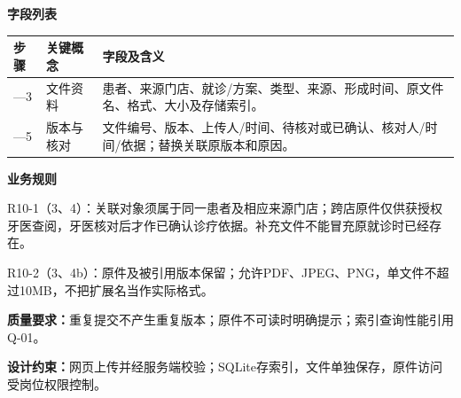 \documentclass[UTF8,a4paper,zihao=-4,fontset=none]{ctexart}
\begin{document}
\noindent\textbf{字段列表}\par
{\setlength{\tabcolsep}{3pt}\renewcommand{\arraystretch}{1.04}
\noindent\begin{tabular}{@{}>{\raggedright\arraybackslash}p{1.2cm}>{\raggedright\arraybackslash}p{2.2cm}>{\raggedright\arraybackslash}p{12.3cm}@{}}
\toprule
步骤 & 关键概念 & 字段及含义 \\ \midrule
1—3 & 文件资料 & 患者、来源门店、就诊/方案、类型、来源、形成时间、原文件名、格式、大小及存储索引。 \\
3—5 & 版本与核对 & 文件编号、版本、上传人/时间、待核对或已确认、核对人/时间/依据；替换关联原版本和原因。 \\
\bottomrule
\end{tabular}\par}
\smallskip
\noindent\textbf{业务规则}\par
\noindent R10-1（3、4）：关联对象须属于同一患者及相应来源门店；跨店原件仅供获授权牙医查阅，牙医核对后才作已确认诊疗依据。补充文件不能冒充原就诊时已经存在。\par
\noindent R10-2（3、4b）：原件及被引用版本保留；允许PDF、JPEG、PNG，单文件不超过10MB，不把扩展名当作实际格式。\par
\smallskip
\noindent\textbf{质量要求：}重复提交不产生重复版本；原件不可读时明确提示；索引查询性能引用Q-01。\par
\noindent\textbf{设计约束：}网页上传并经服务端校验；SQLite存索引，文件单独保存，原件访问受岗位权限控制。\par
\endgroup
\clearpage
\end{document}
